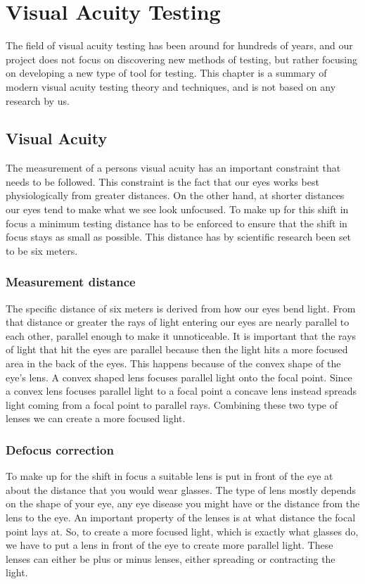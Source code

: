 \documentclass[12pt,a4paper,notitlepage]{report}
\begin{document}
\chapter{ Visual Acuity Testing}
The field of visual acuity testing has been around for hundreds of years, and our project does not focus on discovering new methods of testing, but rather focusing on developing a new type of tool for testing. This chapter is a summary of modern visual acuity testing theory and techniques, and is not based on any research by us. 

\section{Visual Acuity}
The measurement of a persons visual acuity has an important constraint that needs to be followed. This constraint is the fact that our eyes works best physiologically from greater distances. On the other hand, at shorter distances our eyes tend to make what we see look unfocused. To make up for this shift in focus a minimum testing distance has to be enforced to ensure that the shift in focus stays as small as possible. This distance has by scientific research been set to be six meters. \cite{Acuity_Book}

\subsection{Measurement distance}
The specific distance of six meters is derived from how our eyes bend light. From that distance or greater the rays of light entering our eyes are nearly parallel to each other, parallel enough to make it unnoticeable. It is important that the rays of light that hit the eyes are parallel because then the light hits a more focused area in the back of the eyes. This happens because of the convex shape of the eye's lens. A convex shaped lens focuses parallel light onto the focal point. Since a convex lens focuses parallel light to a focal point a concave lens instead spreads light coming from a focal point to parallel rays. Combining these two type of lenses we can create a more focused light. \cite{Optics_Book}

\subsection{Defocus correction}
To make up for the shift in focus a suitable lens is put in front of the eye at about the distance that you would wear glasses. The type of lens mostly depends on the shape of your eye, any eye disease you might have or the distance from the lens to the eye. An important property of the lenses is at what distance the focal point lays at. So, to create a more focused light, which is exactly what glasses do, we have to put a lens in front of the eye to create more parallel light. These lenses can either be plus or minus lenses, either spreading or contracting the light. \cite{Optics_Book}
\end{document}
